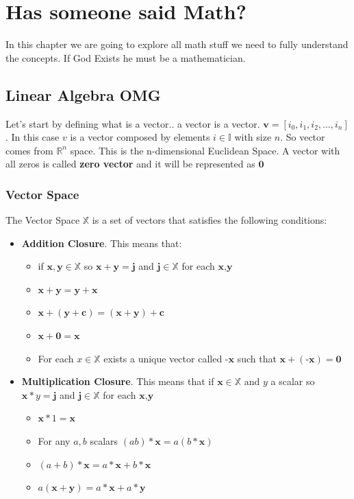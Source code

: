 \documentclass[12pt,a4paper,twoside,openright]{scrbook}
\begin{document}
\chapter{Has someone said Math?}

In this chapter we are going to explore all math stuff we need to fully understand the concepts.
If God Exists he must be a mathematician.

\section{Linear Algebra OMG}

Let's start by defining what is a vector.. a vector is a vector. $\textbf{v} = [i_0, i_1, i_2, ... , i_n]$. In this case $v$ is a vector composed by elements $i \in \mathbb{I}$ with size $n$. So vector comes from $\mathbb{R}^n$ space. This is the n-dimensional Euclidean Space. A vector with all zeros is called \textbf{zero vector} and it will be represented as $\textbf{0}$

\subsection{Vector Space}
The Vector Space $\mathbb{X}$ is a set of vectors that satisfies the following conditions:
\begin{itemize}
\item \textbf{Addition Closure}. This means that:
\begin{itemize}
 \item if $\textbf{x}, \textbf{y} \in \mathbb{X}$ so $\textbf{x} + \textbf{y} = \textbf{j}$ and $\textbf{j} \in \mathbb{X}$ for each $\textbf{x,y}$
 \item  $\textbf{x} + \textbf{y} = \textbf{y} + \textbf{x}$
 \item  $\textbf{x} + (\textbf{y} + \textbf{c}) = (\textbf{x} + \textbf{y}) + \textbf{c}$
 \item $\textbf{x} + \textbf{0} = \textbf{x}$
 \item For each $x \in \mathbb{X}$ exists a unique vector called $\textbf{-x}$ such that $\textbf{x} + (\textbf{-x}) = \textbf{0}$
 \end{itemize} 
\item \textbf{Multiplication Closure}. This means that if $\textbf{x} \in \mathbb{X}$ and $y$ a scalar so $\textbf{x} * y = \textbf{j}$ and $\textbf{j} \in \mathbb{X}$ for each $\textbf{x,y}$ \begin{itemize}
\item $\textbf{x} * 1 = \textbf{x}$
\item For any $a, b$ scalars $(ab)*\textbf{x} = a(b*\textbf{x})$
\item $(a + b)*\textbf{x} = a*\textbf{x} + b*\textbf{x}$
\item $a(\textbf{x} + \textbf{y}) = a*\textbf{x} + a*\textbf{y}$
\end{itemize}
\end{itemize}
\end{document}
